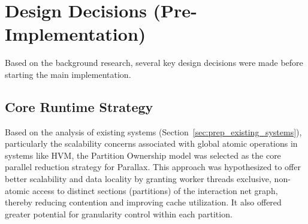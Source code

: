 

\section{Design Decisions (Pre-Implementation)}

Based on the background research, several key design decisions were made before starting the main implementation.

\subsection{Core Runtime Strategy}
Based on the analysis of existing systems (Section~\ref{sec:prep_existing_systems}), particularly the scalability concerns associated with global atomic operations in systems like HVM, the Partition Ownership model was selected as the core parallel reduction strategy for Parallax. This approach was hypothesized to offer better scalability and data locality by granting worker threads exclusive, non-atomic access to distinct sections (partitions) of the interaction net graph, thereby reducing contention and improving cache utilization. It also offered greater potential for granularity control within each partition.

